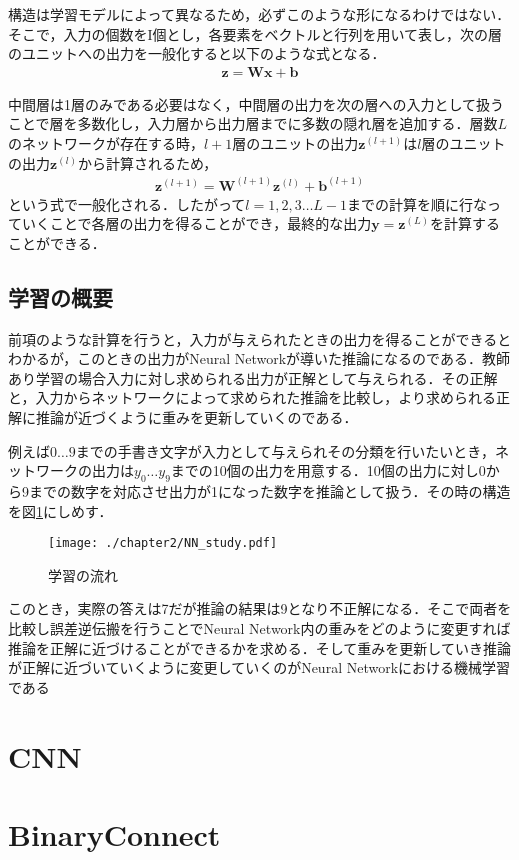 構造は学習モデルによって異なるため，必ずこのような形になるわけではない．そこで，入力の個数をI個とし，各要素をベクトルと行列を用いて表し，次の層のユニットへの出力を一般化すると以下のような式となる．
\begin{align*}
\bm{z} = \bm{W}\bm{x} + \bm{b}
\end{align*}

中間層は1層のみである必要はなく，中間層の出力を次の層への入力として扱うことで層を多数化し，入力層から出力層までに多数の隠れ層を追加する．層数$L$のネットワークが存在する時，$l+1$層のユニットの出力$\bm{z}^{(l+1)}$は$l$層のユニットの出力$\bm{z}^{(l)}$から計算されるため，
\begin{align*}
\bm{z}^{(l+1)} = \bm{W}^{(l+1)}\bm{z}^{(l)} + \bm{b}^{(l+1)}
\end{align*}
という式で一般化される．したがって$l=1,2,3\ldots L-1$までの計算を順に行なっていくことで各層の出力を得ることができ，最終的な出力$\bm{y}=\bm{z}^{(L)}$を計算することができる．

\subsection{学習の概要}
前項のような計算を行うと，入力が与えられたときの出力を得ることができるとわかるが，このときの出力がNeural Networkが導いた推論になるのである．教師あり学習の場合入力に対し求められる出力が正解として与えられる．その正解と，入力からネットワークによって求められた推論を比較し，より求められる正解に推論が近づくように重みを更新していくのである．

例えば$0 \ldots 9$までの手書き文字が入力として与えられその分類を行いたいとき，ネットワークの出力は$y_0 \ldots y_9$までの10個の出力を用意する．10個の出力に対し0から9までの数字を対応させ出力が1になった数字を推論として扱う．その時の構造を図\ref{fig_study}にしめす．
\begin{figure}[]
  \begin{center}
    \texttt{[image: ./chapter2/NN\_study.pdf]}
    \caption{学習の流れ}
    \label{fig_study}
  \end{center}
\end{figure}
このとき，実際の答えは7だが推論の結果は9となり不正解になる．そこで両者を比較し誤差逆伝搬を行うことでNeural Network内の重みをどのように変更すれば推論を正解に近づけることができるかを求める．そして重みを更新していき推論が正解に近づいていくように変更していくのがNeural Networkにおける機械学習である

\section{CNN}

\section{BinaryConnect}

